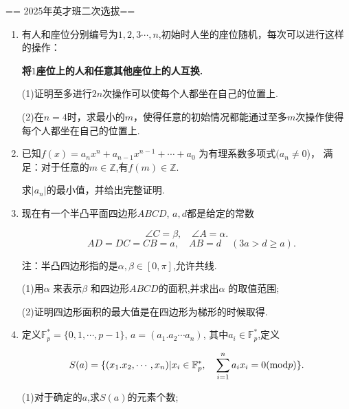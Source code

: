 == 2025年英才班二次选拔==
\begin{enumerate}
\item 有人和座位分别编号为$1,2,3\cdots,n$,初始时人坐的座位随机，每次可以进行这样的操作：
	\begin{center}
	\textbf{将$1$座位上的人和任意其他座位上的人互换.}
	\end{center}
	(1)证明至多进行$2n$次操作可以使每个人都坐在自己的位置上.
	
	(2)在$n=4$时，求最小的$m$，使得任意的初始情况都能通过至多$m$次操作使得每个人都坐在自己的位置上.

\item 已知$f(x)=a_nx^n+ a_{n-1} x^{n-1}+\cdots+a_0$
为有理系数多项式$(a_n\neq 0$)，
满足：对于任意的$m\in \mathbb{Z}$,有$f(m)\in \mathbb{Z}$.
	
    求$|a_n|$的最小值，并给出完整证明.

\item 现在有一个半凸平面四边形$ABCD$, $a,d$都是给定的常数
	
	\[\angle C=\beta,\quad\angle A=\alpha.\]
    \[\quad AD=DC=CB=a,\quad AB=d\quad(3a>d\geq a).\]
	
	注：半凸四边形指的是$\alpha ,\beta \in [0,\pi]	$,允许共线.
	
	(1)用$\alpha$ 来表示$\beta$ 和四边形$ABCD$的面积,并求出$\alpha$ 的取值范围;
	
	(2)证明四边形面积的最大值是在四边形为梯形的时候取得.



\item 定义$\mathbb{F}_p^* =\{0,1,\cdots,p-1\} $, $a=(a_1.a_2 \cdots a_n)$,
其中$a_i \in \mathbb{F}_p^*$,定义
	
	\[S(a)=\{(x_1.x_2, \cdots, x_n)|x_i \in \mathbb{F}_p^*,\quad \sum_{i=1}^n a_ix_i=0({\rm mod}p) \}.\]
	
	(1)对于确定的$a$,求$S(a)$的元素个数;
	

\end{enumerate}
